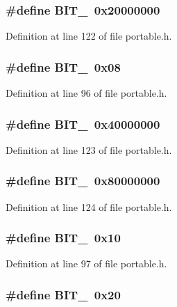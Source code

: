 \subsubsection{\setlength{\rightskip}{0pt plus 5cm}\#define BIT\_\ 0x20000000}\label{portable_8h_a41}




Definition at line 122 of file portable.h.
\subsubsection{\setlength{\rightskip}{0pt plus 5cm}\#define BIT\_\ 0x08}\label{portable_8h_a15}




Definition at line 96 of file portable.h.
\subsubsection{\setlength{\rightskip}{0pt plus 5cm}\#define BIT\_\ 0x40000000}\label{portable_8h_a42}




Definition at line 123 of file portable.h.
\subsubsection{\setlength{\rightskip}{0pt plus 5cm}\#define BIT\_\ 0x80000000}\label{portable_8h_a43}




Definition at line 124 of file portable.h.
\subsubsection{\setlength{\rightskip}{0pt plus 5cm}\#define BIT\_\ 0x10}\label{portable_8h_a16}




Definition at line 97 of file portable.h.
\subsubsection{\setlength{\rightskip}{0pt plus 5cm}\#define BIT\_\ 0x20}\label{portable_8h_a17}




